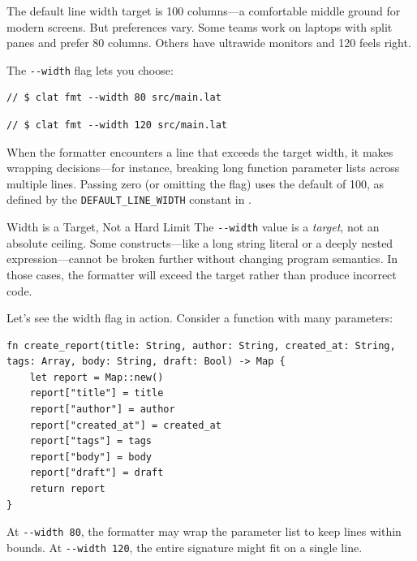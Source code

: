 The default line width target is 100 columns---a comfortable middle ground for modern screens.
But preferences vary.
Some teams work on laptops with split panes and prefer 80 columns.
Others have ultrawide monitors and 120 feels right.

The \lstinline|--width| flag lets you choose:

\begin{lstlisting}[language=Lattice, caption={Setting line width to 80 columns}]
// $ clat fmt --width 80 src/main.lat
\end{lstlisting}

\begin{lstlisting}[language=Lattice, caption={Setting line width to 120 columns}]
// $ clat fmt --width 120 src/main.lat
\end{lstlisting}

When the formatter encounters a line that exceeds the target width, it makes wrapping decisions---for instance, breaking long function parameter lists across multiple lines.
Passing zero (or omitting the flag) uses the default of 100, as defined by the \lstinline|DEFAULT_LINE_WIDTH| constant in .

\begin{notebox}{Width is a Target, Not a Hard Limit}
The \lstinline|--width| value is a \emph{target}, not an absolute ceiling.
Some constructs---like a long string literal or a deeply nested expression---cannot be broken further without changing program semantics.
In those cases, the formatter will exceed the target rather than produce incorrect code.
\end{notebox}

Let's see the width flag in action.
Consider a function with many parameters:

\begin{lstlisting}[language=Lattice, caption={A function with many parameters}]
fn create_report(title: String, author: String, created_at: String, tags: Array, body: String, draft: Bool) -> Map {
    let report = Map::new()
    report["title"] = title
    report["author"] = author
    report["created_at"] = created_at
    report["tags"] = tags
    report["body"] = body
    report["draft"] = draft
    return report
}
\end{lstlisting}

At \lstinline|--width 80|, the formatter may wrap the parameter list to keep lines within bounds.
At \lstinline|--width 120|, the entire signature might fit on a single line.

